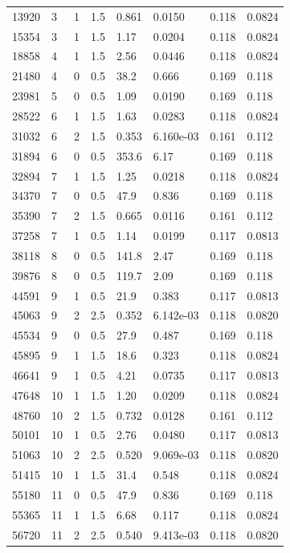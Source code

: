 \documentclass[preview]{standalone}
\begin{document}
{{\begin{tabular}{L{1.2cm}C{1.2cm} C{0.3cm}C{0.5cm} C{1.4cm}C{1.4cm} C{1.4cm}C{1.4cm}}
  13920  &     3  & 1     & 1.5 &  0.861  & 0.0150  & 0.118 &  0.0824   \\ 
  15354  &     3  & 1     & 1.5 &  1.17  & 0.0204  & 0.118 &  0.0824   \\ 
  18858  &     4  & 1     & 1.5 &  2.56  & 0.0446  & 0.118 &  0.0824   \\ 
  21480  &     4  & 0     & 0.5 &  38.2  & 0.666  & 0.169 &  0.118   \\ 
  23981  &     5  & 0     & 0.5 &  1.09  & 0.0190  & 0.169 &  0.118   \\ 
  28522  &     6  & 1     & 1.5 &  1.63  & 0.0283  & 0.118 &  0.0824   \\ 
  31032  &     6  & 2     & 1.5 &  0.353  & 6.160e-03  & 0.161 &  0.112   \\ 
  31894  &     6  & 0     & 0.5 &  353.6  & 6.17  & 0.169 &  0.118   \\ 
  32894  &     7  & 1     & 1.5 &  1.25  & 0.0218  & 0.118 &  0.0824   \\ 
  34370  &     7  & 0     & 0.5 &  47.9  & 0.836  & 0.169 &  0.118   \\ 
  35390  &     7  & 2     & 1.5 &  0.665  & 0.0116  & 0.161 &  0.112   \\ 
  37258  &     7  & 1     & 0.5 &  1.14  & 0.0199  & 0.117 &  0.0813   \\ 
  38118  &     8  & 0     & 0.5 &  141.8  & 2.47  & 0.169 &  0.118   \\ 
  39876  &     8  & 0     & 0.5 &  119.7  & 2.09  & 0.169 &  0.118   \\ 
  44591  &     9  & 1     & 0.5 &  21.9  & 0.383  & 0.117 &  0.0813   \\ 
  45063  &     9  & 2     & 2.5 &  0.352  & 6.142e-03  & 0.118 &  0.0820   \\ 
  45534  &     9  & 0     & 0.5 &  27.9  & 0.487  & 0.169 &  0.118   \\ 
  45895  &     9  & 1     & 1.5 &  18.6  & 0.323  & 0.118 &  0.0824   \\ 
  46641  &     9  & 1     & 0.5 &  4.21  & 0.0735  & 0.117 &  0.0813   \\ 
  47648  &    10  & 1     & 1.5 &  1.20  & 0.0209  & 0.118 &  0.0824   \\ 
  48760  &    10  & 2     & 1.5 &  0.732  & 0.0128  & 0.161 &  0.112   \\ 
  50101  &    10  & 1     & 0.5 &  2.76  & 0.0480  & 0.117 &  0.0813   \\ 
  51063  &    10  & 2     & 2.5 &  0.520  & 9.069e-03  & 0.118 &  0.0820   \\ 
  51415  &    10  & 1     & 1.5 &  31.4  & 0.548  & 0.118 &  0.0824   \\ 
  55180  &    11  & 0     & 0.5 &  47.9  & 0.836  & 0.169 &  0.118   \\ 
  55365  &    11  & 1     & 1.5 &  6.68  & 0.117  & 0.118 &  0.0824   \\ 
  56720  &    11  & 2     & 2.5 &  0.540  & 9.413e-03  & 0.118 &  0.0820   \\ 
\hline 
\end{tabular} 

}}
\end{document}
